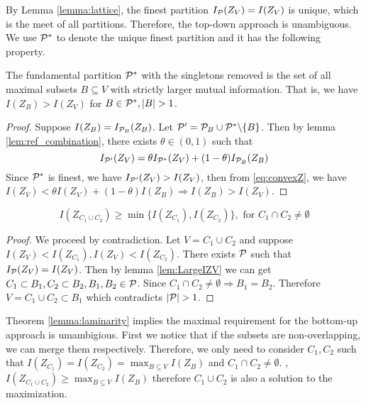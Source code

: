 \documentclass{article}
\begin{document}
By Lemma \ref{lemma:lattice}, the finest partition $I_{\P}(Z_V)=I(Z_V)$ is unique, which is the meet of all partitions. Therefore, the top-down approach is unambiguous. We use $\P^*$ to denote the unique finest partition and it has the following property.
\begin{lemma}\label{lemma:strict_larger_mi}
The fundamental partition $\P^*$ with the singletons removed is the set of all maximal subsets $B \subseteq V$ with strictly larger mutual information. 
That is, we have
$I(Z_B) > I(Z_V)$ for $B \in \P^*, \abs{B}>1$.
\end{lemma}
\begin{proof}
Suppose $I(Z_B)=I_{\P_B}(Z_B)$.
Let $\P' = \P_B \cup  \P^* \backslash \{B\}$.
Then by lemma \ref{lem:ref_combination}, there exists $\theta \in (0,1)$ such that 
\begin{equation}\label{eq:convexZ}
I_{\P'}(Z_V) = \theta I_{\P^*}(Z_V) + (1-\theta) I_{\P_B}(Z_B)
\end{equation}
Since $\P^*$ is finest, we have $I_{\P'}(Z_V) > I(Z_V)$, then from \eqref{eq:convexZ}, we have 
$I(Z_V) < \theta I(Z_V) + (1-\theta) I(Z_B) \Rightarrow I(Z_B) > I(Z_V)$.
\end{proof}
\begin{lemma}[Laminarity]\label{lemma:laminarity}
\begin{equation}\label{eq:P}
I(Z_{C_1 \cup C_2}) \geq \min\{ I(Z_{C_1}), I(Z_{C_2})\}, \textrm{ for } C_1\cap C_2 \neq \emptyset
\end{equation}
\end{lemma}
\begin{proof}
	We proceed by contradiction. Let $V=C_1 \cup C_2$ and suppose $I(Z_V) < I(Z_{C_1}),
	I(Z_V) < I(Z_{C_2})$. There exists $\P$ such that $I_{\P}(Z_V) = I(Z_V)$.
	Then by lemma \ref{lem:LargeIZV} we can get $C_1 \subset B_1, C_2 \subset B_2, B_1, B_2 \in
	\P$. Since $C_1 \cap C_2 \neq \emptyset \Rightarrow B_1 = B_2$. Therefore $V=C_1 \cup C_2 \subset B_1$ which contradicts $\abs{\P}>1$.
\end{proof}
Theorem \ref{lemma:laminarity} implies the maximal requirement for the bottom-up approach is umambigious. First we notice that if the subsets are non-overlapping, we can merge them respectively. Therefore, we only need to consider $C_1, C_2$ such that $I(Z_{C_1}) = I(Z_{C_2}) = \max_{B\subseteq V} I(Z_B)$ and $C_1\cap C_2 \neq \emptyset$. , $I(Z_{C_1\cup C_2}) \geq \max_{B\subseteq V} I(Z_B)$ therefore $C_1\cup C_2$ is also a solution to the maximization.
\end{document}

